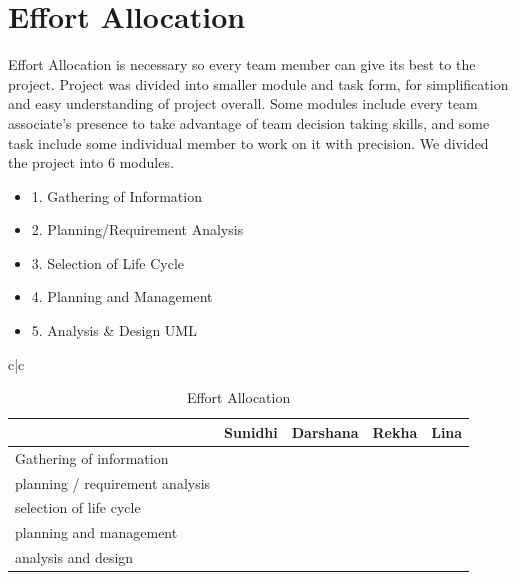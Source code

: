 \section{Effort Allocation}
Effort Allocation is necessary so every team member can give its best to the project. Project was divided into smaller module and task form, for simplification and easy understanding of project overall. Some modules include every team associate’s presence to take advantage of team decision taking skills, and some task include some individual member to work on it with precision. We divided the project into 6 modules.
\begin{itemize}

\item 1.	Gathering of Information
\item 2.	Planning/Requirement Analysis
\item 3.    Selection of Life Cycle
\item 4.	Planning and Management
\item 5.	Analysis & Design UML
\end{itemize}



\begin{table}[H]
    \centering
    \begin{tabular}{c|c}
         \begin{tabularx}{1\textwidth} { 
  | >{\raggedright\arraybackslash}X 
  | >{\centering\arraybackslash}X
  | >{\centering\arraybackslash}X
  | >{\centering\arraybackslash}X
  |>{\centering\arraybackslash}X | }
 \hline
 & Sunidhi & Darshana & Rekha & Lina \\
 \hline
Gathering of information &\checkmark &\checkmark &\checkmark &\checkmark\\
\hline
planning / requirement analysis  &&\checkmark&\checkmark&\\
\hline
 selection of life cycle   &\checkmark&& &\checkmark \\
\hline
planning and management &\checkmark&\checkmark&& \\
\hline
analysis and design &&&\checkmark&\checkmark \\
\hline

\end{tabularx} 
    \end{tabular}
    \caption{Effort Allocation }
    \label{tab:my_label}
\end{table}




